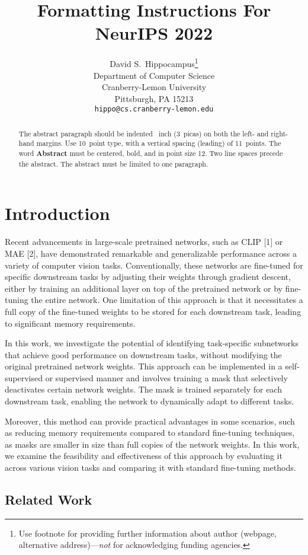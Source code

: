 \documentclass{article}
\title{Formatting Instructions For NeurIPS 2022}
\author{%
    David S.~Hippocampus\thanks{Use footnote for providing further information
    about author (webpage, alternative address)---\emph{not} for acknowledging
    funding agencies.} \\
    Department of Computer Science\\
    Cranberry-Lemon University\\
    Pittsburgh, PA 15213 \\
    \texttt{hippo@cs.cranberry-lemon.edu} \\
}
\begin{document}
    \maketitle


    \begin{abstract}
        The abstract paragraph should be indented ~inch (3~picas) on
        both the left- and right-hand margins. Use 10~point type, with a vertical
        spacing (leading) of 11~points. The word \textbf{Abstract} must be centered,
        bold, and in point size 12. Two line spaces precede the abstract. The abstract
        must be limited to one paragraph.
    \end{abstract}


    \section{Introduction}
    Recent advancements in large-scale pretrained networks, such as CLIP [1] or MAE [2], have demonstrated remarkable and generalizable performance across a variety of computer vision tasks. Conventionally, these networks are fine-tuned for specific downstream tasks by adjusting their weights through gradient descent, either by training an additional layer on top of the pretrained network or by fine-tuning the entire network. One limitation of this approach is that it necessitates a full copy of the fine-tuned weights to be stored for each downstream task, leading to significant memory requirements.

    In this work, we investigate the potential of identifying task-specific subnetworks that achieve good performance on downstream tasks, without modifying the original pretrained network weights. This approach can be implemented in a self-supervised or supervised manner and involves training a mask that selectively deactivates certain network weights. The mask is trained separately for each downstream task, enabling the network to dynamically adapt to different tasks.

    Moreover, this method can provide practical advantages in some scenarios, such as reducing memory requirements compared to standard fine-tuning techniques, as masks are smaller in size than full copies of the network weights. In this work, we examine the feasibility and effectiveness of this approach by evaluating it across various vision tasks and comparing it with standard fine-tuning methods.


    \subsection{Related Work}
\end{document}
